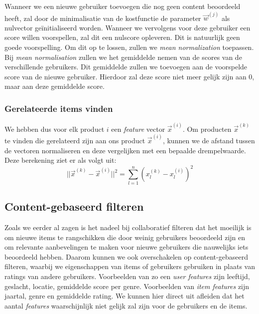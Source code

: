 Wanneer we een nieuwe gebruiker toevoegen die nog geen content beoordeeld heeft, zal door de minimalisatie van de kostfunctie de parameter $\vec{w}^{(j)}$ als nulvector geïnitialiseerd worden. Wanneer we vervolgens voor deze gebruiker een score willen voorspellen, zal dit een nulscore opleveren. Dit is natuurlijk geen goede voorspelling. Om dit op te lossen, zullen we \textit{mean normalization} toepassen. \\
\newline
Bij \textit{mean normalisation} zullen we het gemiddelde nemen van de scores van de verschillende gebruikers. Dit gemiddelde zullen we toevoegen aan de voorspelde score van de nieuwe gebruiker. Hierdoor zal deze score niet meer gelijk zijn aan 0, maar aan deze gemiddelde score. 

\subsubsection{Gerelateerde items vinden}

We hebben dus voor elk product $i$ een \textit{feature} vector $\vec{x}^{(i)}$. Om producten $\vec{x}^{(k)}$ te vinden die gerelateerd zijn aan ons product $\vec{x}^{(i)}$, kunnen we de afstand tussen de vectoren normaliseren en deze vergelijken met een bepaalde drempelwaarde. Deze berekening ziet er als volgt uit:
\begin{equation}
	|| \vec{x}^{(k)} - \vec{x}^{(i)} ||^{2} = \sum_{l=1}^{n} (x_{l}^{(k)} - x_{l}^{(i)})^{2}
\end{equation}

\subsection{Content-gebaseerd filteren}

Zoals we eerder al zagen is het nadeel bij collaboratief filteren dat het moeilijk is om nieuwe items te rangschikken die door weinig gebruikers beoordeeld zijn en om relevante aanbevelingen te maken voor nieuwe gebruikers die nauwelijks iets beoordeeld hebben. Daarom kunnen we ook overschakelen op content-gebaseerd filteren, waarbij we eigenschappen van items of gebruikers gebruiken in plaats van ratings van andere gebruikers. Voorbeelden van zo een \textit{user features} zijn leeftijd, geslacht, locatie, gemiddelde score per genre. Voorbeelden van \textit{item features} zijn jaartal, genre en gemiddelde rating. We kunnen hier direct uit afleiden dat het aantal \textit{features} waarschijnlijk niet gelijk zal  zijn voor de gebruikers en de items. 

